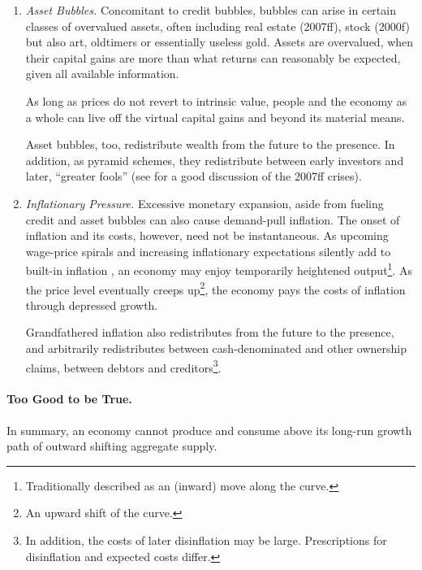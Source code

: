 \begin{enumerate}
	\item {} \label{it:asset_bubbles} \emph{Asset Bubbles.} Concomitant to credit bubbles, bubbles can arise in certain classes of overvalued assets, often including real estate (2007ff), stock (2000f) but also art, oldtimers or essentially useless gold. Assets are overvalued, when their capital gains are more than what returns can reasonably be expected, given all available information. %

	As long as prices do not revert to intrinsic value, people and the economy as a whole can live off the virtual capital gains and beyond its material means. %

	Asset bubbles, too, redistribute wealth from the future to the presence. In addition, as pyramid schemes, they redistribute between early investors and later, ``greater fools'' (see \citealt{Stiglitz2010} for a good discussion of the 2007ff crises).

	\item {} \label{it:inflationary_pressure} \emph{Inflationary Pressure.} Excessive monetary expansion, aside from fueling credit and asset bubbles can also cause demand-pull inflation. The onset of inflation and its costs, however, need not be instantaneous. As upcoming wage-price spirals and increasing inflationary expectations silently add to built-in inflation \citep{Gordon1988}, an economy may enjoy temporarily  heightened output\footnote{
		Traditionally described as an (inward) move along the \cite{Phillips1958} curve.}. 
	As the price level eventually creeps up\footnote{
		An upward shift of the \cite{Phillips1958} curve.}, 
	the economy pays the costs of inflation through depressed growth.

	Grandfathered inflation also redistributes from the future to the presence, and arbitrarily redistributes between cash-denominated and other ownership claims, between debtors and creditors\footnote{
		In addition, the costs of later disinflation may be large. Prescriptions for disinflation and expected costs differ.}.%
\end{enumerate}

\paragraph[Too Good To Be True]{Too Good to be True.}
In summary, an economy cannot produce and consume above its long-run growth path of outward shifting aggregate supply. 

